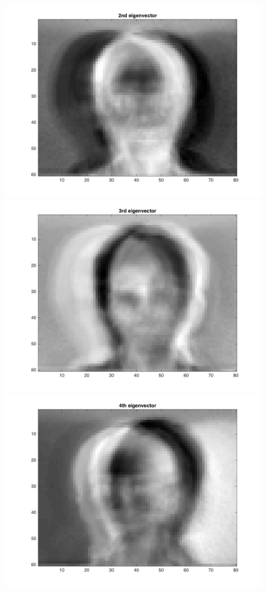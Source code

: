 \documentclass{article}
\begin{document}
\begin{figure}[H]
\includegraphics[scale =.5]{report7_2}
\includegraphics[scale =.5]{report7_3}
\includegraphics[scale =.5]{report7_4}

\end{figure}
\end{document}
